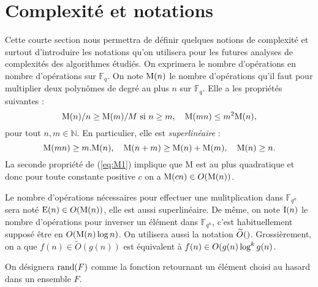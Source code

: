 \documentclass[a4paper]{article} %
\numberwithin{section}{part}
\numberwithin{equation}{section}
\newcommand\GF[1]{\mathbb{F}_{#1}}
\newcommand\NN{\mathbb{N}}
\newcommand\M[1]{\textup{M}(#1)}
\newcommand\E[1]{\textup{E}(#1)}
\newcommand\I[1]{\textup{I}(#1)}
\newcommand\tO[1]{\widetilde{O}(#1)}
\begin{document}
\section{Complexité et notations}
Cette courte section nous permettra de définir quelques notions de complexité
et surtout d'introduire les notations qu'on utilisera pour les futures analyses
de complexités des algorithmes étudiés.
On exprimera le nombre d'opérations en nombre d'opérations sur $\GF{q}$. On note
$\M{n}$ le nombre d'opérations qu'il faut pour multiplier deux polynômes
de degré au plus $n$ sur $\GF{q}$. Elle a les propriétés suivantes :
\begin{equation}
\label{eq:M1}
\M{n}/n\geq\M{m}/M\textup{ si }n\geq m,\quad \M{mn} \leq m^2\M{n},
\end{equation}
pour tout $n, m\in\NN$. En particulier, elle est \emph{superlinéaire} :
\begin{equation}
\M{mn}\geq m.\M{n},\quad \M{n + m}\geq\M{n} + \M{m}, \quad \M{n}\geq n.
\end{equation}
La seconde propriété de (\ref{eq:M1}) implique que M est au plus quadratique et 
donc pour toute constante positive $c$ on a $\M{cn}\in O(\M{n})$.\par
Le nombre d'opérations nécessaires pour effectuer une mulitplication dans
$\GF{q^n}$ sera noté $\E{n}\in O(\M{n})$, elle est aussi superlinéaire. De même,
on note $\I{n}$ le nombre d'opérations pour inverser un élément dans $\GF{q^n}$,
c'est habituellement supposé être en $O(\M{n}\,\textup{log\,}n)$.
On utilisera aussi la notation $\tO$. Grossièrement, on a que $f(n)\in\tO{g(n)}$
est équivalent à $f(n)\in O(g(n)\,\textup{log}^k\,g(n)$.
\begin{defn}
On désignera $\textup{rand}(F)$ comme la fonction retournant un élément choisi
au hasard dans un ensemble $F$.
\end{defn}
\end{document}
